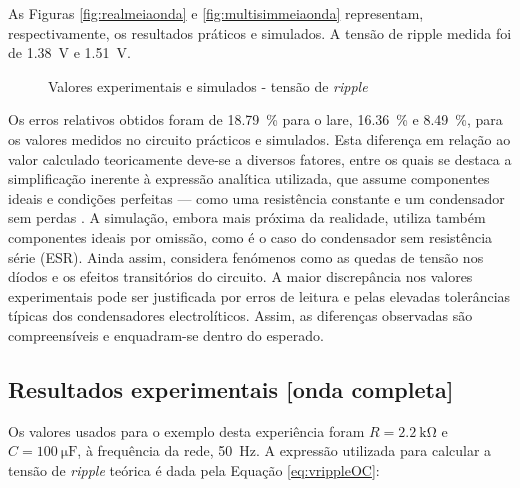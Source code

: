 As Figuras \ref{fig:realmeiaonda} e \ref{fig:multisimmeiaonda} representam, respectivamente, os resultados práticos e simulados. A tensão de ripple medida foi de \SI{1.38}{\volt} e \SI{1.51}{\volt}.

\begin{figure}[hbtp]
	\centering%
		\centering
		\qquad
		\caption{Valores experimentais e simulados - tensão de \textit{ripple}}%
		\label{fig:simulacaoripple}%
	\end{figure}

Os erros relativos obtidos foram de \SI{18.79}{\percent} para o \acrshort{lare}, \SI{16.36}{\percent} e \SI{8.49}{\percent}, para os valores medidos no circuito prácticos e simulados. Esta diferença em relação ao valor calculado teoricamente deve-se a diversos fatores, entre os quais se destaca a simplificação inerente à expressão analítica utilizada, que assume componentes ideais e condições perfeitas — como uma resistência constante e um condensador sem perdas \cite{sedrasmith}. A simulação, embora mais próxima da realidade, utiliza também componentes ideais por omissão, como é o caso do condensador sem resistência série (ESR). Ainda assim, considera fenómenos como as quedas de tensão nos díodos e os efeitos transitórios do circuito. A maior discrepância nos valores experimentais pode ser justificada por erros de leitura e pelas elevadas tolerâncias típicas dos condensadores electrolíticos. Assim, as diferenças observadas são compreensíveis e enquadram-se dentro do esperado.

\subsection{Resultados experimentais [onda completa]}
\label{sec:resultados_RectificadoresOndacompleta}
Os valores usados para o exemplo desta experiência foram $R=\SI{2.2}{\kilo\ohm}$ e $C=\SI{100}{\micro\farad}$, à frequência da rede, \SI{50}{\hertz}. A expressão utilizada para calcular a tensão de \textit{ripple} teórica é dada pela Equação \ref{eq:vrippleOC}:

